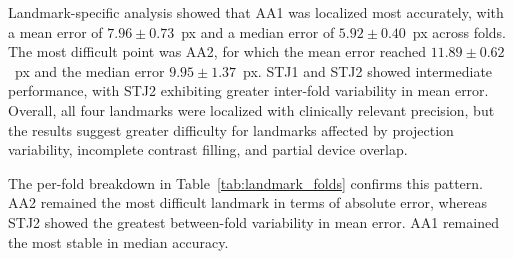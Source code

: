 \documentclass[oneside,pdflatex,sn-mathphys-num]{sn-jnl}
\begin{document}
Landmark-specific analysis showed that AA1 was localized most accurately, with a mean error of $7.96 \pm 0.73$~px and a median error of $5.92 \pm 0.40$~px across folds. The most difficult point was AA2, for which the mean error reached $11.89 \pm 0.62$~px and the median error $9.95 \pm 1.37$~px. STJ1 and STJ2 showed intermediate performance, with STJ2 exhibiting greater inter-fold variability in mean error. Overall, all four landmarks were localized with clinically relevant precision, but the results suggest greater difficulty for landmarks affected by projection variability, incomplete contrast filling, and partial device overlap.

\begin{table}[htbp]
\caption{Landmark-wise localization accuracy aggregated over five folds}\label{tab:landmark_summary}
\centering
{}
\end{table}

The per-fold breakdown in Table~\ref{tab:landmark_folds} confirms this pattern. AA2 remained the most difficult landmark in terms of absolute error, whereas STJ2 showed the greatest between-fold variability in mean error. AA1 remained the most stable in median accuracy.

\begin{table}[htbp]
\caption{Per-fold landmark localization errors for BAMNet}\label{tab:landmark_folds}
\centering
{}
\end{table}
\end{document}
